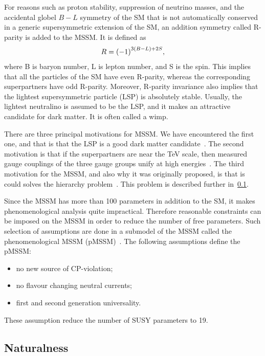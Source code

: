For reasons such as proton stability, suppression of neutrino masses, and the accidental globel $B-L$ symmetry of the SM that is not automatically conserved in a generic supersymmetric extension of the SM, an addition symmetry called R-parity is added to the MSSM. It is defined as
\begin{equation}
R=\qty(-1)^{3(B-L)+2S},
\end{equation}
where B is baryon number, L is lepton number, and S is the spin. This implies that
all the particles of the SM have even R-parity, whereas the corresponding
superpartners have odd R-parity. Moreover,
R-parity invariance also implies that the lightest supersymmetric particle (LSP) is
absolutely stable. Usually, the lightest neutralino is assumed to be the LSP, and it makes an attractive candidate for dark matter. It is often called a \gls{wimp}.

There are three principal motivations for MSSM. We have encountered the first one, and that is that the LSP is a good dark matter candidate~\cite{Garrett_2011}. The second motivation is that if the superpartners are near the TeV scale, then measured gauge couplings of the three gauge groups unify at high energies~\cite{PhysRevD.24.1681}. The third motivation for the MSSM, and also why it was originally proposed, is that is could solves the hierarchy problem~\cite{DIMOPOULOS1981150}. This problem is described further in~\ref{sec:naturalness}.

Since the MSSM has more than 100 parameters in addition to the SM, it makes phenomenological analysis quite impractical. Therefore reasonable constraints can be imposed on the MSSM in order to reduce the number of free parameters. Such selection of assumptions are done in a submodel of the MSSM called the phenomenological MSSM (pMSSM)~\cite{djouadi1999minimal,Berger_2009}. The following assumptions define the pMSSM:
\begin{itemize}
\item no new source of CP-violation;
\item no flavour changing neutral currents;
\item first and second generation universality.
\end{itemize}
These assumption reduce the number of SUSY parameters to 19.


\subsection{Naturalness}
\label{sec:naturalness}

